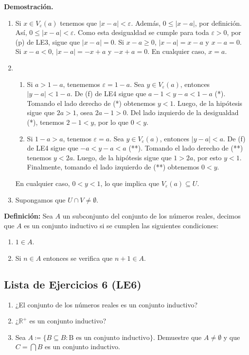 \documentclass[11pt]{article}
\newcommand{\R}{\mathbb{R}}
\begin{document}
\textbf{Demostración.}

\begin{enumerate}[label=\alph*)]
    \item Si $x\in V_\varepsilon(a)$ tenemos que $|x-a|<\varepsilon$. Además, $0\leq |x-a|$, por definición. Así, $0\leq |x-a|<\varepsilon$. Como esta desigualdad se cumple para toda $\varepsilon>0$, por (p) de LE3, sigue que $|x-a|=0$. Si $x-a\geq 0$, $|x-a|=x-a$ y $x-a=0$. Si $x-a<0$, $|x-a|=-x+a$ y $-x+a=0$. En cualquier caso, $x=a$.
    
    \item \begin{enumerate}[label=\roman*)]
        \item Si $a>1-a$, tenememos $\varepsilon=1-a$. Sea $y\in V_\varepsilon(a)$, entonces $|y-a|<1-a$. De (f) de LE4 sigue que $a-1<y-a<1-a$ (*). Tomando el lado derecho de (*) obtenemos $y<1$. Luego, de la hipótesis sigue que $2a>1$, osea $2a-1>0$. Del lado izquierdo de la desigualdad (*), tenemos $2-1<y$, por lo que $0<y$.
        \item Si $1-a>a$, tenemos $\varepsilon=a$. Sea $y\in V_\varepsilon(a)$, entonces $|y-a|<a$. De (f) de LE4 sigue que $-a<y-a<a$ (**). Tomando el lado derecho de (**) tenemos $y<2a$. Luego, de la hipótesis sigue que $1>2a$, por esto $y<1$. Finalmente, tomando el lado izquierdo de (**) obtenemos $0<y$.\end{enumerate}
        En cualquier caso, $0<y<1$, lo que implica que $V_\varepsilon(a) \subseteq U$.

    \item Supongamos que $U\cap V \neq \emptyset$. 
    \end{enumerate}

\textbf{Definición:} Sea $A$ un subconjunto del conjunto de los números reales, decimos que $A$ es un conjunto inductivo si se cumplen las siguientes condiciones:
    \begin{enumerate}
        \item $1 \in A$.
        \item Si $n \in A$ entonces se verifica que $n+1 \in A$.
    \end{enumerate}

\subsection*{Lista de Ejercicios 6 (LE6)}

\begin{enumerate}[label=\arabic*)]
    \item ¿El conjunto de los números reales es un conjunto inductivo?
    \item ¿$\R^+$ es un conjunto inductivo?
    \item Sea $A\coloneqq \{B \subseteq B: \text{B es un conjunto inductivo}\}$. Demuestre que $A\neq \emptyset$ y que $C=\bigcap B$ es un conjunto inductivo.
\end{enumerate}
\end{document}
